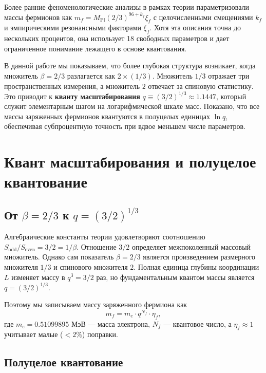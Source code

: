 \documentclass[12pt,a4paper]{article}
\begin{document}
	Более ранние феноменологические анализы в рамках теории параметризовали массы фермионов как $m_f = M_{\mathrm{Pl}}(2/3)^{96+k_f}\xi_f$ с целочисленными смещениями $k_f$ и эмпирическими резонансными факторами $\xi_f$. Хотя эта описания точна до нескольких процентов, она использует 18 свободных параметров и дает ограниченное понимание лежащего в основе квантования.
	
	В данной работе мы показываем, что более глубокая структура возникает, когда множитель $\beta = 2/3$ разлагается как $2 \times (1/3)$. Множитель $1/3$ отражает три пространственных измерения, а множитель $2$ отвечает за спиновую статистику. Это приводит к \textbf{кванту масштабирования} $q \equiv (3/2)^{1/3} \approx 1.1447$, который служит элементарным шагом на логарифмической шкале масс. Показано, что все массы заряженных фермионов квантуются в полуцелых единицах $\ln q$, обеспечивая субпроцентную точность при вдвое меньшем числе параметров.
	
	\section{Квант масштабирования и полуцелое квантование}
	
	\subsection{От $\beta = 2/3$ к $q = (3/2)^{1/3}$}
	
	Алгебраические константы теории удовлетворяют соотношению $S_{\mathrm{odd}}/S_{\mathrm{even}} = 3/2 = 1/\beta$. Отношение $3/2$ определяет межпоколенный массовый множитель. Однако сам показатель $\beta = 2/3$ является произведением размерного множителя $1/3$ и спинового множителя $2$. Полная единица глубины координации $L$ изменяет массу в $q^3 = 3/2$ раз, но фундаментальным квантом массы является $q = (3/2)^{1/3}$.
	
	Поэтому мы записываем массу заряженного фермиона как
	\begin{equation}
		m_f = m_e \cdot q^{N_f} \cdot \eta_f,
		\label{eq:quantized}
	\end{equation}
	где $m_e = 0.51099895$ МэВ — масса электрона, $N_f$ — квантовое число, а $\eta_f \approx 1$ учитывает малые ($<2\%$) поправки.
	
	\subsection{Полуцелое квантование}
	
\end{document}
